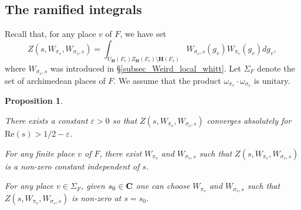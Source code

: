 \documentclass[11pt, reqno]{amsart}
\theoremstyle{plain}
\newtheorem{prop}[theorem]{Proposition}
\theoremstyle{definition}
\theoremstyle{remark}
\theoremstyle{plain}
\def\C{{\bf C}}
\def\H{{H}}
\def\H{\mathbf{H}}
\begin{document}
\subsection{The ramified integrals}\label{ramified_integrals}

Recall that, for any place $v$ of $F$, we have set
\[Z(s,W_{\pi_v},W_{\sigma_v,s}) = \int_{U_\H(F_v)Z_\H(F_v)\setminus \H(F_v)} W_{\sigma_v,s}\left(g_v\right)W_{\pi_v}(g_v)dg_v,\]
where $W_{\sigma_v,s}$ was introduced in \S \ref{subsec_Weird_local_whitt}. Let $\Sigma_F$ denote the set of archimedean places of $F$. We assume that the product $\omega_{\pi_v} \cdot \omega_{\sigma_v}$ is unitary.



\begin{prop}\label{non:vanishing:and:abs:conv:zeta:bad}
\item[(i)]  There exists a constant $\varepsilon > 0$ so that $Z(s,W_{\pi_v},W_{\sigma_v,s})$ converges absolutely for $\mathrm{Re}(s)> 1/2-\varepsilon$.
\item[(ii)] For any finite place $v$ of $F$, there exist $W_{\pi_v}$ and $W_{\sigma_v,s}$ such that $Z(s,W_{\pi_v},W_{\sigma_v,s})$ is a non-zero constant independent of $s$. 
\item[(iii)] For any place $v \in \Sigma_F$, given $s_0 \in \C$ one can choose $W_{\pi_v}$ and $W_{\sigma_v,s}$ such that $Z(s,W_{\pi_v},W_{\sigma_v,s})$ is non-zero at $s = s_0$.
\end{prop}
\end{document}

